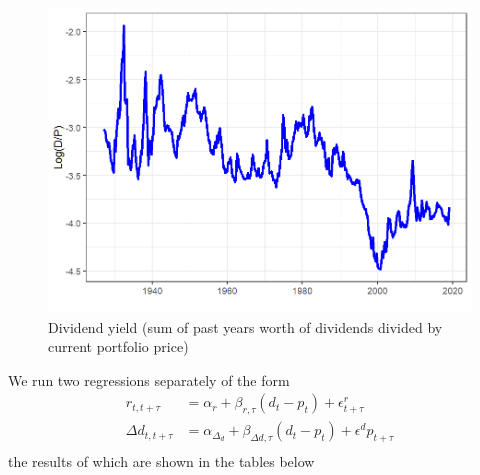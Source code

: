 \documentclass[11pt,letter]{article}
\begin{document}
\begin{figure}
	\includegraphics[width=\linewidth]{log_dividend_yield.png}
	\caption{Dividend yield (sum of past years worth of dividends divided by current portfolio price)}
	\label{fig:div_yield}
\end{figure}
We run two regressions separately of the form
\begin{equation*}
	\begin{split}
	r_{t, t+\tau} & = \alpha_r + \beta_{r, \tau}(d_t - p_t) + \epsilon^r_{t+\tau}\\
	\Delta d_{t, t+\tau} & = \alpha_{\Delta_d}+\beta_{\Delta d, \tau}(d_t - p_t)+ \epsilon^dp_{t+\tau}\\
	\end{split}
\end{equation*}
the results of which are shown in the tables below
\end{document}
